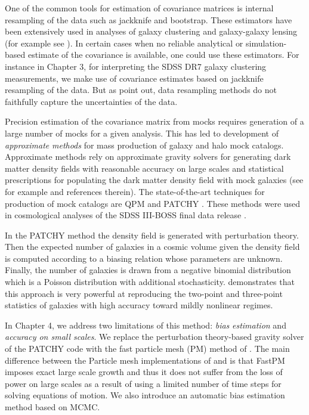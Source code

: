 One of the common tools for estimation of covariance matrices is internal resampling of the data such as jackknife and bootstrap. These estimators have been extensively used in analyses of galaxy clustering and galaxy-galaxy lensing (for example see \citealt{reid2014,hod_vs_sham,shirasaki2016,singh2016,kwan2017}).
In certain cases when no reliable analytical or simulation-based estimate of the covariance is available, one could use these estimators. 
For instance in Chapter 3, for interpreting the SDSS DR7 galaxy clustering measurements, 
we make use of covariance estimates based on jackknife resampling of the data. But as \citet{norberg,fried2016} point out, data resampling methods do not faithfully capture the uncertainties of the data. 

Precision estimation of the covariance matrix from mocks requires generation of a large number of mocks for a given analysis. This has led to development of \emph{approximate} \emph{methods} for mass production of galaxy and halo mock catalogs. Approximate methods rely on approximate gravity solvers for generating dark matter density fields with reasonable accuracy on large scales and statistical prescriptions for populating the dark matter density field with mock galaxies (see for example \citealt{pthalo,qpm,eazymock,kitaura2016} and references 
therein). The state-of-the-art techniques for production of mock catalogs are QPM \citep{qpm} and PATCHY \citep{kitaura2016}. These methods were used in 
cosmological analyses of the SDSS III-BOSS final data release \citep{alam2016}.

In the PATCHY method the density field is generated with perturbation theory. Then the expected number of galaxies in a cosmic volume given the density field is computed according to a biasing relation whose parameters are unknown. 
Finally, the number of galaxies is drawn from a negative binomial distribution which is a Poisson distribution with additional stochasticity. 
\citet{chuang2015} demonstrates that this approach is very powerful at reproducing the two-point and three-point statistics of galaxies with high accuracy toward mildly nonlinear regimes.

In Chapter 4, we address two limitations of this method: \emph{bias} \emph{estimation} and \emph{accuracy on small scales}. We replace the perturbation theory-based 
gravity solver of the PATCHY code with the fast particle mesh (PM) method of \citet{fastpm}. The main difference between the Particle mesh implementations of \citet{fastpm} and \citet{qpm} is that 
FastPM imposes exact large scale growth and thus it does not suffer from the loss of power on large scales as a result of using a limited number of time steps for solving equations of motion. We also introduce an automatic bias estimation method based on MCMC. 

